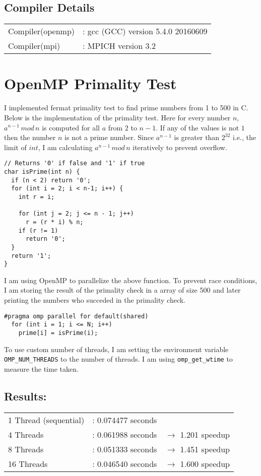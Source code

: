 \documentclass[12pt, letterpaper]{article}
\begin{document}
\subsection{Compiler Details}
\label{sec:compiler}

\begin{tabular}{@{$\bullet$ }ll}
  Compiler(openmp) &: gcc (GCC) version 5.4.0 20160609\\
  Compiler(mpi)    &: MPICH version 3.2\\
\end{tabular}

\section{OpenMP Primality Test}

I implemented fermat primality test to find prime numbers from 1 to 500 in C.
Below is the implementation of the primality test.
Here for every number $n$, $a^{n - 1}\,mod\,n$ is computed for
all $a$ from $2$ to $n - 1$. If any of the values is not $1$ then the number $n$ is not a prime number.
Since $a^{n - 1}$ is greater than $2^{32}$ i.e., the limit of $int$, I am
calculating $a^{n - 1}\,mod\,n$ iteratively to prevent overflow.

\begin{verbatim}
// Returns '0' if false and '1' if true
char isPrime(int n) {
  if (n < 2) return '0';
  for (int i = 2; i < n-1; i++) {
    int r = i;

    for (int j = 2; j <= n - 1; j++)
      r = (r * i) % n;
    if (r != 1)
      return '0';
  }
  return '1';
}
\end{verbatim}

I am using OpenMP to parallelize the above function. To prevent race conditions, I am storing the result of the primality check in a array of size 500 and later printing the numbers who succeded in the primality check.

\begin{verbatim}
#pragma omp parallel for default(shared)
  for (int i = 1; i <= N; i++)
    prime[i] = isPrime(i);
\end{verbatim}

To use custom number of threads,
I am setting the environment variable \verb~OMP_NUM_THREADS~ to the number of threads.
I am using \verb~omp_get_wtime~ to measure the time taken.

\subsection{Results:}
\begin{tabular}{@{$\bullet$ }lll}
  1 Thread (sequential)  &: 0.074477 seconds &\\
  4 Threads              &: 0.061988 seconds &$\rightarrow$ 1.201  speedup \\
  8 Threads              &: 0.051333 seconds &$\rightarrow$ 1.451 speedup\\
  16 Threads             &: 0.046540 seconds &$\rightarrow$ 1.600 speedup\\
\end{tabular}
\end{document}
